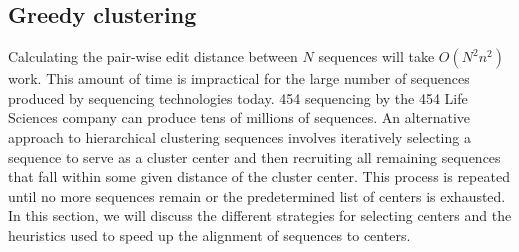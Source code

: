 \subsection{Greedy clustering}

Calculating the pair-wise edit distance between $N$ sequences will take $O(N^2n^2)$ work.
This amount of time is impractical for the large number of sequences produced by sequencing technologies today.
454 sequencing by the 454 Life Sciences company can produce tens of millions of sequences.
An alternative approach to hierarchical clustering sequences involves iteratively selecting a sequence to serve as a cluster center and then recruiting all remaining sequences that fall within some given distance of the cluster center.
This process is repeated until no more sequences remain or the predetermined list of centers is exhausted.
In this section, we will discuss the different strategies for selecting centers and the heuristics used to speed up the alignment of sequences to centers.













